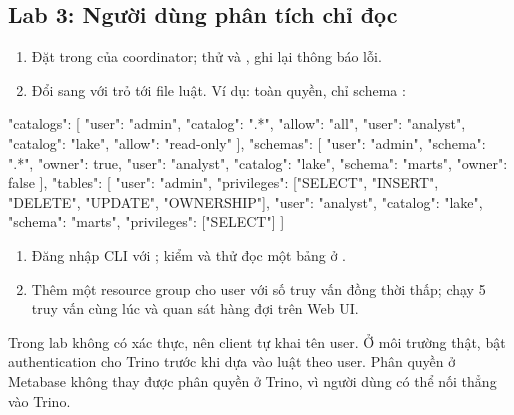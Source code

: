 \subsection{Lab 3: Người dùng phân tích chỉ đọc}
\begin{enumerate}
  \item Đặt  trong  của coordinator; thử  và , ghi lại thông báo lỗi.
  \item Đổi sang  với  trỏ tới file luật. Ví dụ:  toàn quyền,  chỉ  schema :
\end{enumerate}
\begin{codeblock}
{
  "catalogs": [
    {"user": "admin", "catalog": ".*", "allow": "all"},
    {"user": "analyst", "catalog": "lake", "allow": "read-only"}
  ],
  "schemas": [
    {"user": "admin", "schema": ".*", "owner": true},
    {"user": "analyst", "catalog": "lake", "schema": "marts", "owner": false}
  ],
  "tables": [
    {"user": "admin", "privileges": ["SELECT", "INSERT", "DELETE", "UPDATE", "OWNERSHIP"]},
    {"user": "analyst", "catalog": "lake", "schema": "marts", "privileges": ["SELECT"]}
  ]
}
\end{codeblock}
\begin{enumerate}[resume]
  \item Đăng nhập CLI với ; kiểm  và thử đọc một bảng ở .
  \item Thêm một resource group cho user  với số truy vấn đồng thời thấp; chạy 5 truy vấn cùng lúc và quan sát hàng đợi trên Web UI.
\end{enumerate}
\begin{luuy}
Trong lab không có xác thực, nên client tự khai tên user. Ở môi trường thật, bật authentication cho Trino trước khi dựa vào luật theo user. Phân quyền ở Metabase không thay được phân quyền ở Trino, vì người dùng có thể nối thẳng vào Trino.
\end{luuy}

